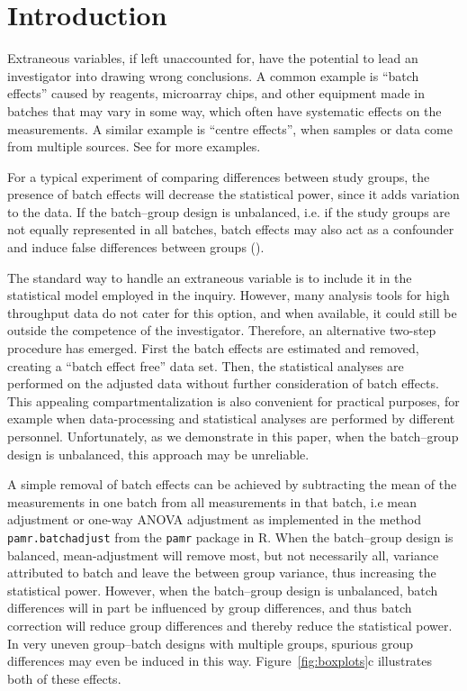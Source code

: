 \documentclass{bio}
\begin{document}
\section{Introduction}\label{intro}

Extraneous variables, if left unaccounted for, have the potential to lead an investigator into drawing wrong conclusions. A common example is ``batch effects'' caused by reagents, microarray chips, and other equipment made in batches that may vary in some way, which often have systematic effects on the measurements. A similar example is ``centre effects'', when samples or data come from multiple sources. See \citet{Luo2010} for more examples.

For a typical experiment of comparing differences between study groups, the presence of batch effects will decrease the statistical power, since it adds variation to the data. If the batch--group design is unbalanced, i.e. if the study groups are not equally represented in all batches, batch effects may also act as a confounder and induce false differences between groups (\citealp{Leek2010}).

The standard way to handle an extraneous variable is to include it in the statistical model employed in the inquiry. However, many analysis tools for high throughput data do not cater for this option, and when available, it could still be outside the competence of the investigator. Therefore, an alternative two-step procedure has emerged. First the batch effects are estimated and removed, creating a ``batch effect free'' data set. Then, the statistical analyses are performed on the adjusted data without further consideration of batch effects. This appealing compartmentalization is also convenient for practical purposes, for example when data-processing and statistical analyses are performed by different personnel. Unfortunately, as we demonstrate in this paper, when the batch--group design is unbalanced, this approach may be unreliable.

A simple removal of batch effects can be achieved by subtracting the mean of the measurements in one batch from all measurements in that batch, i.e mean adjustment or one-way ANOVA adjustment as implemented in the method \texttt{pamr.batchadjust} from the \texttt{pamr} package in R. When the batch--group design is balanced, mean-adjustment will remove most, but not necessarily all, variance attributed to batch and leave the between group variance, thus increasing the statistical power. However, when the batch--group design is unbalanced, batch differences will in part be influenced by group differences, and thus batch correction will reduce group differences and thereby reduce the statistical power. In very uneven group--batch designs with multiple groups, spurious group differences may even be induced in this way. Figure~\ref{fig:boxplots}c illustrates both of these effects.
\end{document}
